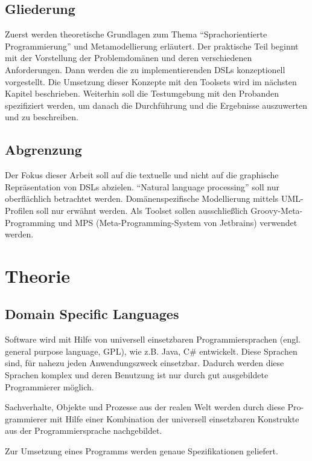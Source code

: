 \documentclass[11pt,english,ngerman, headsepline]{scrreprt}
\begin{document}
\section{Gliederung}

Zuerst werden theoretische Grundlagen zum Thema “Sprachorientierte
Programmierung” und Metamodellierung erläutert. Der praktische Teil beginnt mit
der Vorstellung der Problemdomänen und deren verschiedenen Anforderungen. Dann
werden die zu implementierenden DSLs konzeptionell vorgestellt. Die Umsetzung
dieser Konzepte mit den Toolsets wird im nächsten Kapitel beschrieben. Weiterhin
soll die Testumgebung mit den Probanden spezifiziert werden, um danach die
Durchführung und die Ergebnisse auszuwerten und zu beschreiben.



\section{Abgrenzung}
Der Fokus dieser Arbeit soll auf die textuelle und nicht auf die graphische
Repräsentation von DSLs abzielen. “Natural language processing” soll nur
oberflächlich betrachtet werden. Domänenspezifische Modellierung mittels
UML-Profilen soll nur erwähnt werden. Als Toolset sollen
ausschließlich Groovy-Meta-Programming und MPS (Meta-Programming-System von
Jetbrains) verwendet werden.

\chapter{Theorie}

\section{Domain Specific Languages}
 
 
Software wird mit Hilfe von universell einsetzbaren Programmiersprachen  (engl.
general purpose language, GPL), wie z.B. Java, C\# entwickelt. Diese Sprachen
sind, für nahezu jeden Anwendungszweck einsetzbar.
Dadurch werden diese Sprachen komplex und deren Benutzung ist nur durch gut
ausgebildete Programmierer möglich.

Sachverhalte, Objekte und Prozesse aus der realen Welt werden durch diese Pro-
grammierer mit Hilfe einer Kombination der universell einsetzbaren Konstrukte
aus der Programmiersprache nachgebildet. 

Zur Umsetzung eines Programms werden genaue Spezifikationen geliefert.  
\end{document}
